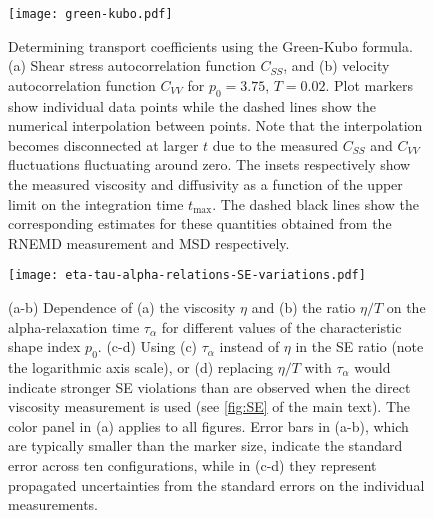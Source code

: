 \documentclass[amsmath,amssymb,prl,reprint,twocolumn]{revtex4-2}
\begin{document}
\begin{figure}[h]
\centering
\texttt{[image: green-kubo.pdf]}
\vspace{-1\intextsep}
\caption{Determining transport coefficients using the Green-Kubo formula.
(a) Shear stress autocorrelation function $C_{SS}$, and (b) velocity autocorrelation function $C_{VV}$ for $p_0=3.75$, $T=0.02$. Plot markers show individual data points while the dashed lines show the numerical interpolation between points. Note that the interpolation becomes disconnected at larger $t$ due to the measured $C_{SS}$ and $C_{VV}$ fluctuations fluctuating around zero.
The insets respectively show the measured viscosity and diffusivity as a function of the upper limit on the integration time $t_{\text{max}}$.
The dashed black lines show the corresponding estimates for these quantities obtained from the RNEMD measurement and MSD respectively.
}
\label{fig:green-kubo}
\end{figure}


\begin{figure}[h]
\centering
\texttt{[image: eta-tau-alpha-relations-SE-variations.pdf]}
\vspace{-.5\intextsep}
\caption{(a-b) Dependence of (a) the viscosity $\eta$ and (b) the ratio $\eta/T$ on the alpha-relaxation time $\tau_{\alpha}$ for different values of the characteristic shape index $p_0$. 
(c-d) Using (c) $\tau_{\alpha}$ instead of $\eta$ in the SE ratio (note the logarithmic axis scale), or 
(d) replacing $\eta/T$ with $\tau_{\alpha}$ would indicate stronger SE violations than are observed when the direct viscosity measurement is used (see \cref{fig:SE} of the main text). 
The color panel in (a) applies to all figures.
Error bars in (a-b), which are typically smaller than the marker size, indicate the standard error across ten configurations, while in (c-d) they represent propagated uncertainties from the standard errors on the individual measurements.
}
\label{fig:eta-tau-SE-supp}
\end{figure}
\end{document}
